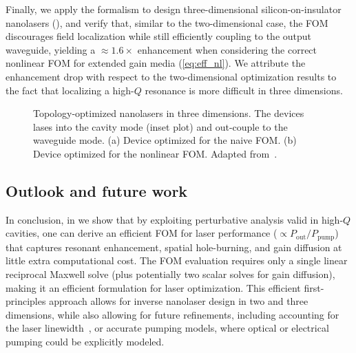 Finally, we apply the formalism to design three-dimensional silicon-on-insulator nanolasers (), 
and verify that, similar to the two-dimensional case, the FOM discourages field localization while still efficiently coupling to the output waveguide, yielding a $\approx 1.6\times$
enhancement when considering the correct nonlinear FOM for extended gain media (\eqref{eq:eff_nl}). We attribute the enhancement drop with respect to the two-dimensional optimization results to the fact that localizing a high-$Q$ resonance is more difficult in three dimensions.

\begin{figure}[tb]
    \centering
    \caption{Topology-optimized nanolasers in three dimensions. The devices lases into the cavity mode (inset plot) and out-couple to the waveguide mode. (a) Device optimized for the naive FOM. (b) Device optimized for the nonlinear FOM.
    Adapted from~\cite{ownpub4}.}
    \label{fig:laser3d}
\end{figure}

\subsection*{Outlook and future work}

In conclusion, in \cite{ownpub4} we show that by exploiting perturbative analysis valid in high-$Q$ cavities, one can derive  
an efficient FOM for laser performance ($\propto P_\text{out}/P_\text{pump}$) that captures resonant enhancement,  
spatial hole-burning, and gain diffusion at little extra computational cost. The FOM evaluation requires only a  
single linear reciprocal Maxwell solve (plus potentially two scalar solves for gain diffusion), making it 
an efficient formulation for laser optimization. This efficient first-principles approach allows for inverse nanolaser design in two and three dimensions, while  
also allowing for future refinements, including accounting for the laser linewidth~\cite{pick}, or accurate pumping models, where optical or electrical pumping could be explicitly
modeled.
